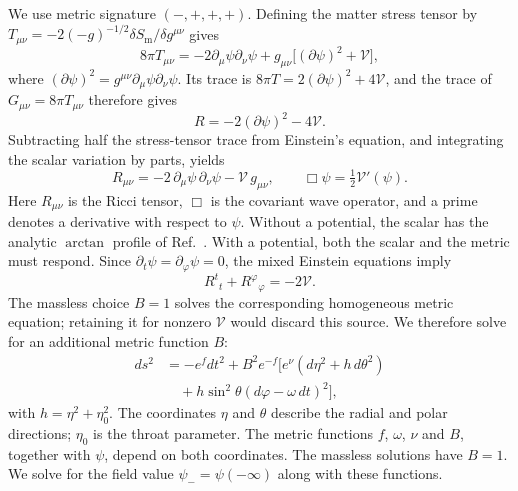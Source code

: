\documentclass[twocolumn,floatfix,aps,prd,superscriptaddress,nofootinbib]{revtex4-2}
\begin{document}
We use metric signature $(-,+,+,+)$. Defining the matter stress tensor by
$T_{\mu\nu}=-2(-g)^{-1/2}\delta S_{\mathrm m}/\delta g^{\mu\nu}$ gives
\begin{equation}
8\pi T_{\mu\nu}=-2\partial_\mu\psi\partial_\nu\psi
 +g_{\mu\nu}\big[(\partial\psi)^2+\mathcal V\big],
\label{eq:stress}
\end{equation}
where $(\partial\psi)^2=g^{\mu\nu}\partial_\mu\psi\partial_\nu\psi$.
Its trace is $8\pi T=2(\partial\psi)^2+4\mathcal V$, and the trace of
$G_{\mu\nu}=8\pi T_{\mu\nu}$ therefore gives
\begin{equation}
R=-2(\partial\psi)^2-4\mathcal V.
\label{eq:trace}
\end{equation}
Subtracting half the stress-tensor trace from Einstein's equation, and
integrating the scalar variation by parts, yields
\begin{equation}
R_{\mu\nu}=-2\,\partial_\mu\psi\,\partial_\nu\psi-\mathcal{V}\,g_{\mu\nu},\qquad
\Box\psi=\tfrac12\mathcal{V}'(\psi).
\label{eq:fieldeqs}
\end{equation}
Here $R_{\mu\nu}$ is the Ricci tensor, $\Box$ is the covariant wave operator, and a prime denotes a derivative with respect to $\psi$. Without a potential, the scalar has the analytic $\arctan$ profile of Ref.~\cite{chew2016}. With a potential, both the scalar and the metric must respond. Since
$\partial_t\psi=\partial_\varphi\psi=0$, the mixed Einstein equations imply
\begin{equation}
R^t{}_t+R^\varphi{}_\varphi=-2\mathcal V.
\label{eq:Bsource}
\end{equation}
The massless choice $B=1$ solves the corresponding homogeneous metric equation;
retaining it for nonzero $\mathcal V$ would discard this source. We therefore
solve for an additional metric function $B$:
\begin{equation}
\begin{split}
ds^2&=-e^{f}dt^2+B^2e^{-f}\Big[e^{\nu}\left(d\eta^2+h\,d\theta^2\right)\\
&\quad+h\sin^2\!\theta\left(d\varphi-\omega\,dt\right)^2\Big],
\end{split}
\label{eq:metric}
\end{equation}
with $h=\eta^2+\eta_0^2$. The coordinates $\eta$ and $\theta$ describe the radial and polar directions; $\eta_0$ is the throat parameter. The metric functions $f$, $\omega$, $\nu$ and $B$, together with $\psi$, depend on both coordinates. The massless solutions have $B=1$. We solve for the field value $\psi_-=\psi(-\infty)$ along with these functions.
\end{document}

